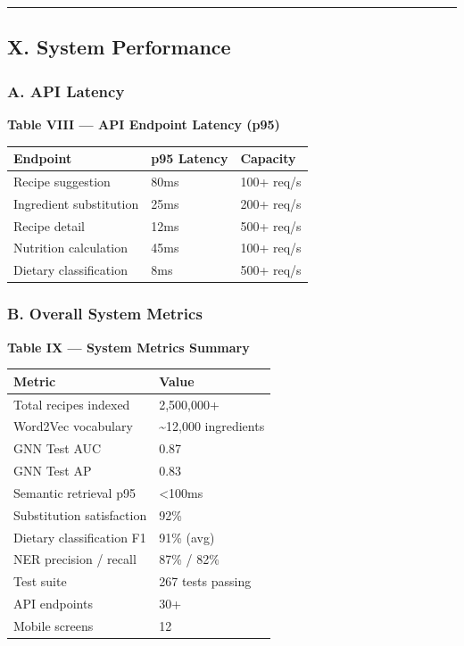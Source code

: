 \documentclass[
  10pt,
]{article}
\begin{document}
\begin{center}\rule{0.5\linewidth}{0.5pt}\end{center}

\subsection{X. System Performance}\label{x.-system-performance}

\subsubsection{A. API Latency}\label{a.-api-latency}

\textbf{Table VIII --- API Endpoint Latency (p95)}

\begin{longtable}[]{@{}lll@{}}
\toprule\noalign{}
Endpoint & p95 Latency & Capacity \\
\midrule\noalign{}
\endhead
\bottomrule\noalign{}
\endlastfoot
Recipe suggestion & 80ms & 100+ req/s \\
Ingredient substitution & 25ms & 200+ req/s \\
Recipe detail & 12ms & 500+ req/s \\
Nutrition calculation & 45ms & 100+ req/s \\
Dietary classification & 8ms & 500+ req/s \\
\end{longtable}

\subsubsection{B. Overall System
Metrics}\label{b.-overall-system-metrics}

\textbf{Table IX --- System Metrics Summary}

\begin{longtable}[]{@{}ll@{}}
\toprule\noalign{}
Metric & Value \\
\midrule\noalign{}
\endhead
\bottomrule\noalign{}
\endlastfoot
Total recipes indexed & 2,500,000+ \\
Word2Vec vocabulary & \textasciitilde12,000 ingredients \\
GNN Test AUC & 0.87 \\
GNN Test AP & 0.83 \\
Semantic retrieval p95 & \textless100ms \\
Substitution satisfaction & 92\% \\
Dietary classification F1 & 91\% (avg) \\
NER precision / recall & 87\% / 82\% \\
Test suite & 267 tests passing \\
API endpoints & 30+ \\
Mobile screens & 12 \\
\end{longtable}
\end{document}
